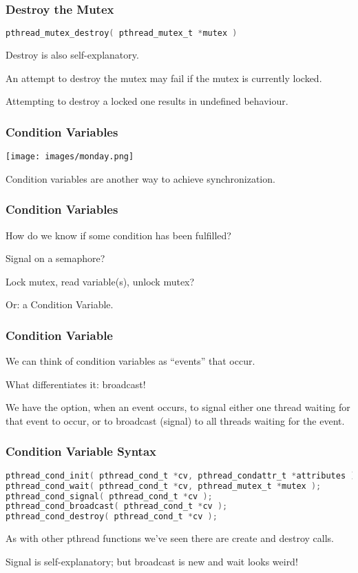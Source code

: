 \begin{frame}[fragile]
	\frametitle{Destroy the Mutex}

	\begin{lstlisting}[language=C]
pthread_mutex_destroy( pthread_mutex_t *mutex )
\end{lstlisting}

	Destroy is also self-explanatory.

	An attempt to destroy the mutex may fail if the mutex is currently locked.

	Attempting to destroy a locked one results in undefined behaviour.

\end{frame}

\begin{frame}
	\frametitle{Condition Variables}

	\begin{center}
		\texttt{[image: images/monday.png]}
	\end{center}

	Condition variables are another way to achieve synchronization.

\end{frame}

\begin{frame}
	\frametitle{Condition Variables}

	How do we know if some condition has been fulfilled?

	Signal on a semaphore?

	Lock mutex, read variable(s), unlock mutex?

	Or: a Condition Variable.

\end{frame}


\begin{frame}
	\frametitle{Condition Variable}

	We can think of condition variables as ``events'' that occur.

	What differentiates it: broadcast!

	We have the option, when an event occurs, to signal either one thread waiting for that event to occur, or to broadcast (signal) to all threads waiting for the event.

\end{frame}

\begin{frame}[fragile]
	\frametitle{Condition Variable Syntax}

	\begin{lstlisting}[language=C]
pthread_cond_init( pthread_cond_t *cv, pthread_condattr_t *attributes );
pthread_cond_wait( pthread_cond_t *cv, pthread_mutex_t *mutex );
pthread_cond_signal( pthread_cond_t *cv );
pthread_cond_broadcast( pthread_cond_t *cv );
pthread_cond_destroy( pthread_cond_t *cv );
\end{lstlisting}

	As with other pthread functions we've seen there are create and destroy calls.

	Signal is self-explanatory; but broadcast is new and wait looks weird!

\end{frame}


